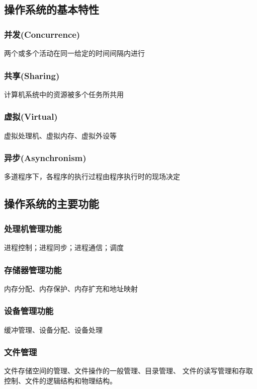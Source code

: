 \documentclass{article}
\begin{document}
\subsection{操作系统的基本特性}
\subsubsection{\color{red}并发(Concurrence)}
两个或多个活动在同一给定的时间间隔内进行
\vspace*{-0.4cm}
\subsubsection{\color{red}共享(Sharing)}
计算机系统中的资源被多个任务所共用
\vspace*{-0.4cm}
\subsubsection{\color{red}虚拟(Virtual)}
虚拟处理机、虚拟内存、虚拟外设等
\vspace*{-0.4cm}
\subsubsection{\color{red}异步(Asynchronism)}
多道程序下，各程序的执行过程由程序执行时的现场决定

\subsection{操作系统的主要功能}
\subsubsection{\color{red}处理机管理功能}
进程控制；进程同步；进程通信；调度
\vspace*{-0.4cm}
\subsubsection{\color{red}存储器管理功能}
内存分配、内存保护、内存扩充和地址映射
\vspace*{-0.4cm}
\subsubsection{\color{red}设备管理功能}
缓冲管理、设备分配、设备处理
\vspace*{-0.4cm}
\subsubsection{\color{red}文件管理}
文件存储空间的管理、文件操作的一般管理、目录管理、
文件的读写管理和存取控制、文件的逻辑结构和物理结构。
\vspace*{-0.4cm}
\end{document}
